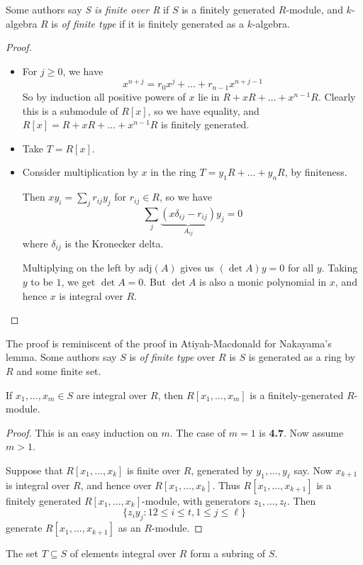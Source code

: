 \documentclass[10pt,a4paper]{article}
\begin{document}
Some authors say \emph{S is finite over R} if $S$ is a finitely generated $R$-module, and $k$-algebra $R$ is \emph{of finite type} if it is finitely generated as a $k$-algebra.
\begin{proof}\hspace*{0cm}
  \begin{itemize}
    \item[\imp{1}{2}] For $j\geq 0$, we have
    \[x^{n+j} = r_0x^j + \ldots + r_{n-1}x^{n+j-1}\]
    So by induction all positive powers of $x$ lie in $R+xR+\ldots+x^{n-1}R$. Clearly this is a submodule of $R[x]$, so we have equality, and $R[x]=R+xR+\ldots+x^{n-1}R$ is finitely generated.
    \item[\imp{2}{3}] Take $T = R[x]$.
    \item[\imp{3}{1}] Consider multiplication by $x$ in the ring $T = y_1R + \ldots + y_nR$, by finiteness.

    Then $xy_i = \sum_{j}r_{ij}y_j$ for $r_{ij} \in R$, so we have
    \[\sum_j \underbrace{(x\delta_{ij} - r_{ij})}_{A_{ij}}y_j = 0\]
    where $\delta_{ij}$ is the Kronecker delta.

    Multiplying on the left by $\text{adj}(A)$ gives us $(\det A)y = 0$ for all $y$. Taking $y$ to be $1$, we get $\det A = 0$. But $\det A$ is also a monic polynomial in $x$, and hence $x$ is integral over $R$.
  \end{itemize}
\end{proof}
The proof is reminiscent of the proof in Atiyah-Macdonald for Nakayama's lemma. Some authors say $S$ is \emph{of finite type} over $R$ is $S$ is generated as a ring by $R$ and some finite set.
\begin{lemma}
  If $x_1, \ldots, x_m \in S$ are integral over $R$, then $R[x_1, \ldots, x_m]$ is a finitely-generated $R$-module.
\end{lemma}
\begin{proof}
  This is an easy induction on $m$. The case of $m=1$ is \textbf{4.7}. Now assume $m >1$.

  Suppose that $R[x_1, \ldots, x_k]$ is finite over $R$, generated by $y_1, \ldots, y_\ell$ say. Now $x_{k+1}$ is integral over $R$, and hence over $R[x_1, \ldots, x_k]$. Thus $R[x_1, \ldots, x_{k+1}]$ is a finitely generated $R[x_1, \ldots, x_k]$-module, with generators $z_1, \ldots, z_t$. Then
  \[\{z_iy_j: 12\leq i\leq t, 1 \leq j \leq \ell\}\]
  generate $R[x_1, \ldots, x_{k+1}]$ as an $R$-module.
\end{proof}
\begin{lemma}
  The set $T\subseteq S$ of elements integral over $R$ form a subring of $S$.
\end{lemma}
\end{document}
